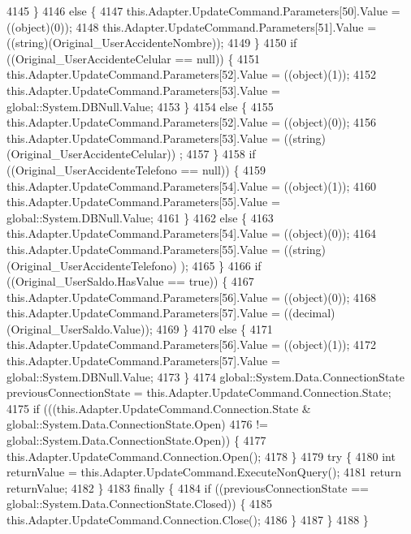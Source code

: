 \begin{DoxyCode}
4145             \}
4146             \textcolor{keywordflow}{else} \{
4147                 this.Adapter.UpdateCommand.Parameters[50].Value = ((object)(0));
4148                 this.Adapter.UpdateCommand.Parameters[51].Value = ((string)(Original\_UserAccidenteNombre));
4149             \}
4150             \textcolor{keywordflow}{if} ((Original\_UserAccidenteCelular == null)) \{
4151                 this.Adapter.UpdateCommand.Parameters[52].Value = ((object)(1));
4152                 this.Adapter.UpdateCommand.Parameters[53].Value = global::System.DBNull.Value;
4153             \}
4154             \textcolor{keywordflow}{else} \{
4155                 this.Adapter.UpdateCommand.Parameters[52].Value = ((object)(0));
4156                 this.Adapter.UpdateCommand.Parameters[53].Value = ((string)(Original\_UserAccidenteCelular))
      ;
4157             \}
4158             \textcolor{keywordflow}{if} ((Original\_UserAccidenteTelefono == null)) \{
4159                 this.Adapter.UpdateCommand.Parameters[54].Value = ((object)(1));
4160                 this.Adapter.UpdateCommand.Parameters[55].Value = global::System.DBNull.Value;
4161             \}
4162             \textcolor{keywordflow}{else} \{
4163                 this.Adapter.UpdateCommand.Parameters[54].Value = ((object)(0));
4164                 this.Adapter.UpdateCommand.Parameters[55].Value = ((string)(Original\_UserAccidenteTelefono)
      );
4165             \}
4166             \textcolor{keywordflow}{if} ((Original\_UserSaldo.HasValue == \textcolor{keyword}{true})) \{
4167                 this.Adapter.UpdateCommand.Parameters[56].Value = ((object)(0));
4168                 this.Adapter.UpdateCommand.Parameters[57].Value = ((decimal)(Original\_UserSaldo.Value));
4169             \}
4170             \textcolor{keywordflow}{else} \{
4171                 this.Adapter.UpdateCommand.Parameters[56].Value = ((object)(1));
4172                 this.Adapter.UpdateCommand.Parameters[57].Value = global::System.DBNull.Value;
4173             \}
4174             global::System.Data.ConnectionState previousConnectionState = 
      this.Adapter.UpdateCommand.Connection.State;
4175             \textcolor{keywordflow}{if} (((this.Adapter.UpdateCommand.Connection.State & global::System.Data.ConnectionState.Open) 
4176                         != global::System.Data.ConnectionState.Open)) \{
4177                 this.Adapter.UpdateCommand.Connection.Open();
4178             \}
4179             \textcolor{keywordflow}{try} \{
4180                 \textcolor{keywordtype}{int} returnValue = this.Adapter.UpdateCommand.ExecuteNonQuery();
4181                 \textcolor{keywordflow}{return} returnValue;
4182             \}
4183             \textcolor{keywordflow}{finally} \{
4184                 \textcolor{keywordflow}{if} ((previousConnectionState == global::System.Data.ConnectionState.Closed)) \{
4185                     this.Adapter.UpdateCommand.Connection.Close();
4186                 \}
4187             \}
4188         \}
\end{DoxyCode}


